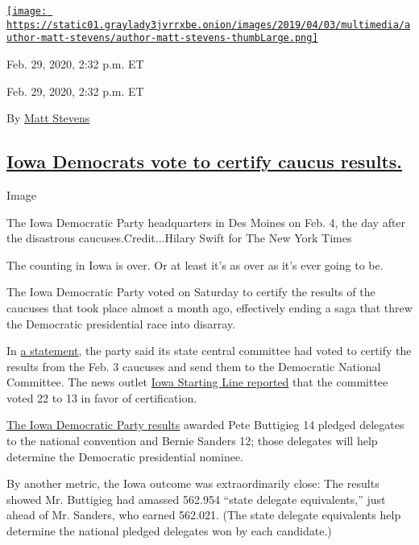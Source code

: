 \href{https://www.nytimes3xbfgragh.onion/by/matt-stevens}{\texttt{[image: https://static01.graylady3jvrrxbe.onion/images/2019/04/03/multimedia/author-matt-stevens/author-matt-stevens-thumbLarge.png]}}

Feb. 29, 2020, 2:32 p.m. ET

Feb. 29, 2020, 2:32 p.m. ET

By \href{https://www.nytimes3xbfgragh.onion/by/matt-stevens}{Matt
Stevens}

\hypertarget{iowa-democrats-vote-to-certify-caucus-results}{%
\subsection{\texorpdfstring{\protect\hyperlink{iowa-democrats-certify-caucus-results}{Iowa
Democrats vote to certify caucus
results.}}{Iowa Democrats vote to certify caucus results.}}\label{iowa-democrats-vote-to-certify-caucus-results}}

Image

The Iowa Democratic Party headquarters in Des Moines on Feb. 4, the day
after the disastrous caucuses.Credit...Hilary Swift for The New York
Times

The counting in Iowa is over. Or at least it's as over as it's ever
going to be.

The Iowa Democratic Party voted on Saturday to certify the results of
the caucuses that took place almost a month ago, effectively ending a
saga that threw the Democratic presidential race into disarray.

In
\href{https://iowademocrats.org/idp-state-central-committee-certifies-2020-iowa-caucus-results/}{a
statement}, the party said its state central committee had voted to
certify the results from the Feb. 3 caucuses and send them to the
Democratic National Committee. The news outlet
\href{https://twitter.com/IAStartingLine/status/1233804386259886080}{Iowa
Starting Line reported} that the committee voted 22 to 13 in favor of
certification.

\href{https://results.thecaucuses.org/}{The Iowa Democratic Party
results} awarded Pete Buttigieg 14 pledged delegates to the national
convention and Bernie Sanders 12; those delegates will help determine
the Democratic presidential nominee.

By another metric, the Iowa outcome was extraordinarily close: The
results showed Mr. Buttigieg had amassed 562.954 ``state delegate
equivalents,'' just ahead of Mr. Sanders, who earned 562.021. (The state
delegate equivalents help determine the national pledged delegates won
by each candidate.)

